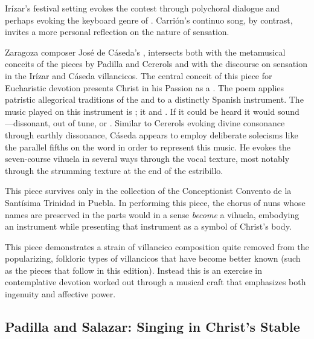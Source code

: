 Irízar's festival setting evokes the contest through polychoral dialogue and 
perhaps evoking the keyboard genre of .
Carrión's continuo song, by contrast, invites a more personal reflection on the 
nature of sensation.

Zaragoza composer José de Cáseda's , intersects 
both with the metamusical conceits of the pieces by Padilla and Cererols and 
with the discourse on sensation in the Irízar and Cáseda villancicos.
The central conceit of this piece for Eucharistic devotion presents Christ in 
his Passion as a .
The poem applies patristic allegorical traditions of the  and 
 to a distinctly Spanish instrument.
The music played on this instrument is ; it 
 and .
If it could be heard it would sound ---dissonant, out of tune, or 
. 
Similar to Cererols evoking divine consonance through earthly dissonance, 
Cáseda appears to employ deliberate solecisms like the parallel fifths on the 
word  in order to represent this  music.
He evokes the seven-course vihuela in several ways through the vocal texture, 
most notably through the strumming texture at the end of the estribillo.

This piece survives only in the collection of the Conceptionist Convento de la 
Santísima Trinidad in Puebla.
In performing this piece, the chorus of nuns whose names are preserved in the 
parts would in a sense \emph{become} a vihuela, embodying an instrument while 
presenting that instrument as a symbol of Christ's body.

This piece demonstrates a strain of villancico composition quite removed from 
the popularizing, folkloric types of villancicos that have become better known 
(such as the pieces that follow in this edition).
Instead this is an exercise in contemplative devotion worked out through a 
musical craft that emphasizes both ingenuity and affective power.

\subsection{Padilla and Salazar: Singing in Christ's Stable}

